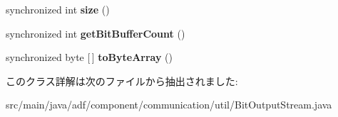 \begin{DoxyCompactItemize}
\item 
\hypertarget{classadf_1_1component_1_1communication_1_1util_1_1BitOutputStream_a6e40fa252db62c2c0e3cac9d0e1ca361}{}\label{classadf_1_1component_1_1communication_1_1util_1_1BitOutputStream_a6e40fa252db62c2c0e3cac9d0e1ca361} 
synchronized int {\bfseries size} ()
\item 
\hypertarget{classadf_1_1component_1_1communication_1_1util_1_1BitOutputStream_a87ce9be63be29582ee8f752ecc8e5e29}{}\label{classadf_1_1component_1_1communication_1_1util_1_1BitOutputStream_a87ce9be63be29582ee8f752ecc8e5e29} 
synchronized int {\bfseries get\+Bit\+Buffer\+Count} ()
\item 
\hypertarget{classadf_1_1component_1_1communication_1_1util_1_1BitOutputStream_ad39fb96d909ec14a93741479dd43934f}{}\label{classadf_1_1component_1_1communication_1_1util_1_1BitOutputStream_ad39fb96d909ec14a93741479dd43934f} 
synchronized byte \mbox{[}$\,$\mbox{]} {\bfseries to\+Byte\+Array} ()
\end{DoxyCompactItemize}


このクラス詳解は次のファイルから抽出されました\+:\begin{DoxyCompactItemize}
\item 
src/main/java/adf/component/communication/util/Bit\+Output\+Stream.\+java\end{DoxyCompactItemize}
